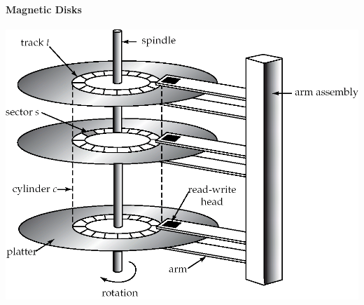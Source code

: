 \documentclass[twocolumn,english]{article}
\begin{document}
\paragraph{Magnetic Disks}

\begin{center}
\includegraphics[scale=0.2]{img/magdisk}
\par\end{center}
\end{document}
